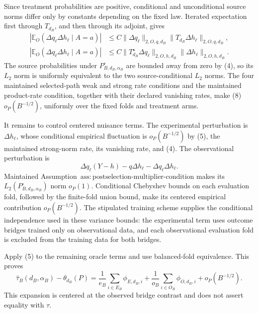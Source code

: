 Since treatment probabilities are positive, conditional and unconditional source norms differ only by constants depending on the fixed law.  Iterated expectation first through \(T_{d_B}\), and then through its adjoint, gives
\[
\begin{aligned}
 |\mathbb E_O(\Delta q_\ell\Delta h_\ell\mid A=a)|
 &\le C\|\Delta q_\ell\|_{2,O,q,d_B}
       \|T_{d_B}\Delta h_\ell\|_{2,O,q,d_B},\\
 |\mathbb E_O(\Delta q_\ell\Delta h_\ell\mid A=a)|
 &\le C\|T_{d_B}^{\star}\Delta q_\ell\|_{2,O,h,d_B}
       \|\Delta h_\ell\|_{2,O,h,d_B}.
                                                               \tag{9}
\end{aligned}
\]
The source probabilities under \(P_{B,d_B,\alpha_B}^{\circ}\) are bounded away from zero by (4), so its \(L_2\) norm is uniformly equivalent to the two source-conditional \(L_2\) norms.  The four maintained selected-path weak and strong rate conditions and the maintained product-rate condition, together with their declared vanishing rates, make (8) \(o_P(B^{-1/2})\), uniformly over the fixed folds and treatment arms.

It remains to control centered nuisance terms.  The experimental perturbation is \(\Delta h_\ell\), whose conditional empirical fluctuation is \(o_P(B^{-1/2})\) by (5), the maintained strong-norm rate, its vanishing rate, and (4).  The observational perturbation is
\[
 \Delta q_\ell(Y-h)-q\Delta h_\ell-\Delta q_\ell\Delta h_\ell. \tag{10}
\]
Maintained Assumption~\(\mathrm{ass{:}postselection\text{-}multiplier\text{-}condition}\) makes its \(L_2(P_{B,d_B,\alpha_B}^{\circ})\) norm \(o_P(1)\).  Conditional Chebyshev bounds on each evaluation fold, followed by the finite-fold union bound, make its centered empirical contribution \(o_P(B^{-1/2})\).  The stipulated training scheme supplies the conditional independence used in these variance bounds: the experimental term uses outcome bridges trained only on observational data, and each observational evaluation fold is excluded from the training data for both bridges.

Apply (5) to the remaining oracle terms and use balanced-fold equivalence.  This proves
\[
 \widehat\tau_B(d_B,\alpha_B)-\theta_{d_B}(P)
 =\frac1{e_B}\sum_{i\in E_B}\phi_{E,d_B,i}
  +\frac1{o_B}\sum_{i\in O_B}\phi_{O,d_B,i}
  +o_P(B^{-1/2}).                                         \tag{11}
\]
This expansion is centered at the observed bridge contrast and does not assert equality with \(\tau\).

